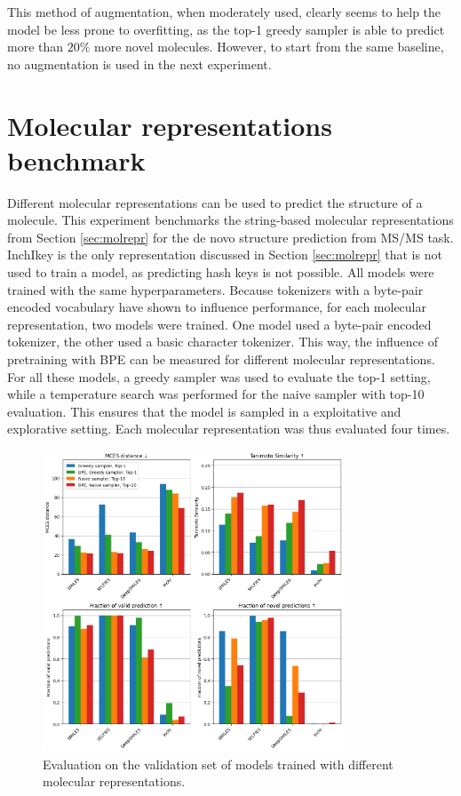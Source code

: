 This method of augmentation, when moderately used, clearly seems to help the model be less prone to overfitting, as the top-1 greedy sampler is able to predict more than $20\%$ more novel molecules. 
However, to start from the same baseline, no augmentation is used in the next experiment.

\section{Molecular representations benchmark}

Different molecular representations can be used to predict the structure of a molecule.
This experiment benchmarks the string-based molecular representations from Section \ref{sec:molrepr} for the de novo structure prediction from \ac{MS/MS} task.
InchIkey is the only representation discussed in Section \ref{sec:molrepr} that is not used to train a model, as predicting hash keys is not possible.
All models were trained with the same hyperparameters.
Because tokenizers with a byte-pair encoded vocabulary have shown to influence performance, for each molecular representation, two models were trained.
One model used a byte-pair encoded tokenizer, the other used a basic character tokenizer.
This way, the influence of pretraining with \ac{BPE} can be measured for different molecular representations.
For all these models, a greedy sampler was used to evaluate the top-1 setting, while a temperature search was performed for the naive sampler with top-10 evaluation.
This ensures that the model is sampled in a exploitative and explorative setting.
Each molecular representation was thus evaluated four times.

\begin{figure}[h]
    \centering
    \includegraphics[width=0.8\textwidth]{figures/results/representations_with_tanimoto.png}
    \caption{Evaluation on the validation set of models trained with different molecular representations.}
    \label{fig:representations}
\end{figure}

